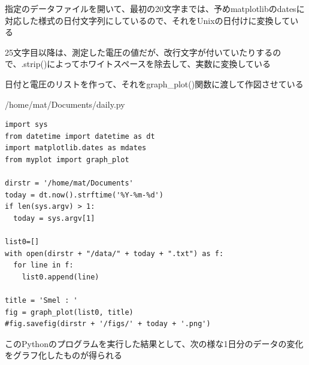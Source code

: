 \documentclass[12pt,a4j]{jsbook}
\begin{document}
	指定のデータファイルを開いて、最初の20文字までは、予めmatplotlibのdatesに対応した様式の日付文字列にしているので、それをUnixの日付けに変換している

	25文字目以降は、測定した電圧の値だが、改行文字が付いていたりするので、.strip()によってホワイトスペースを除去して、実数に変換している

	日付と電圧のリストを作って、それをgraph\_plot()関数に渡して作図させている

\begin{spacing}{0.95}
\begin{itembox}[l]{/home/mat/Documents/daily.py}
\begin{verbatim}
import sys
from datetime import datetime as dt
import matplotlib.dates as mdates
from myplot import graph_plot

dirstr = '/home/mat/Documents'
today = dt.now().strftime('%Y-%m-%d')
if len(sys.argv) > 1:
  today = sys.argv[1]

list0=[]
with open(dirstr + "/data/" + today + ".txt") as f:
  for line in f:
    list0.append(line)

title = 'Smel : '
fig = graph_plot(list0, title)
#fig.savefig(dirstr + '/figs/' + today + '.png')
\end{verbatim}
\end{itembox}
\end{spacing}

\newpage

このPythonのプログラムを実行した結果として、次の様な1日分のデータの変化をグラフ化したものが得られる%
\end{document}
